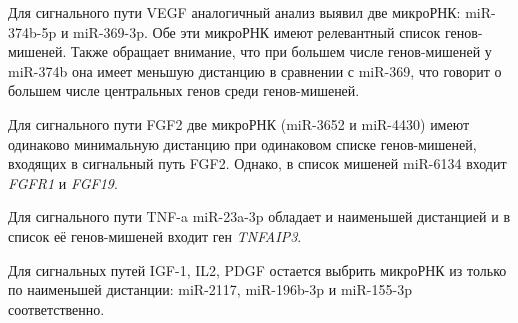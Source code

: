 Для сигнального пути VEGF аналогичный анализ выявил две микроРНК: miR-374b-5p и miR-369-3p. Обе эти микроРНК имеют релевантный список генов-мишеней. Также обращает внимание, что при большем числе генов-мишеней у miR-374b она имеет меньшую дистанцию в сравнении с miR-369, что говорит о большем числе центральных генов среди генов-мишеней.

Для сигнального пути FGF2 две микроРНК (miR-3652 и miR-4430) имеют одинаково минимальную дистанцию при одинаковом списке генов-мишеней, входящих в сигнальный путь FGF2. Однако, в список мишеней miR-6134 входит \textit{FGFR1} и \textit{FGF19}.

Для сигнального пути TNF-a miR-23a-3p обладает и наименьшей дистанцией и в список её генов-мишеней входит ген \textit{TNFAIP3}.

Для сигнальных путей IGF-1, IL2, PDGF остается выбрить микроРНК из только по наименьшей дистанции: miR-2117, miR-196b-3p и miR-155-3p соответственно.